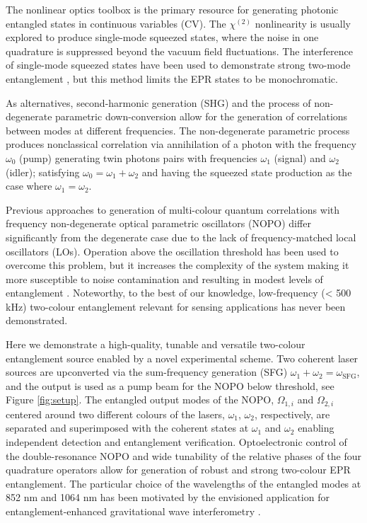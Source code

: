 \documentclass[final,twocolumn,english,prl,notitlepage,nofootinbib,floatfix,longbibliography,superscriptaddress
]{revtex4-2}
\begin{document}
The nonlinear optics toolbox is the primary resource for generating photonic entangled states in continuous variables (CV). The $\chi^{(2)}$ nonlinearity is usually explored to produce single-mode squeezed states, where the noise in one quadrature is suppressed beyond the vacuum field fluctuations. The interference of single-mode squeezed states have been used to demonstrate strong two-mode entanglement \cite{Eberle2013,Steinlechner2013}, but this method limits the EPR states to be monochromatic.\par
As alternatives, second-harmonic generation (SHG) \cite{Grosse2008} and the process of non-degenerate parametric down-conversion \cite{Ou1992,Schori2002} allow for the generation of correlations between modes at different frequencies. The non-degenerate parametric process produces nonclassical correlation via annihilation of a photon with the frequency $\omega_0$ (pump) generating twin photons pairs with frequencies $\omega_1$ (signal) and $\omega_2$ (idler); satisfying $\omega_0 = \omega_1 + \omega_2$ and having the squeezed state production as the case where $\omega_1=\omega_2$. \par
Previous approaches to generation of multi-colour quantum correlations with frequency non-degenerate optical parametric oscillators (NOPO) differ significantly from the degenerate case due to the lack of frequency-matched local oscillators (LOs).  Operation above the oscillation threshold has been used to overcome this problem, but it increases the complexity of the system making it more susceptible to noise contamination and resulting in modest levels of entanglement \cite{Villar2005,Guo2012,Wang2018a}. Noteworthy, to the best of our knowledge, low-frequency (< 500 kHz) two-colour entanglement relevant for sensing applications has never been demonstrated.\par
Here we demonstrate a high-quality, tunable and versatile two-colour  entanglement source enabled by a novel experimental scheme. Two coherent laser sources are upconverted via the sum-frequency generation (SFG) $\omega_1 + \omega_2 = \omega_{\text{SFG}}$, and the output is  used as a pump beam for the NOPO below threshold, see Figure \ref{fig:setup}. The entangled output modes of the NOPO, $\Omega_{1,i}$ and $\Omega_{2,i}$ centered around two different colours of the lasers, $\omega_1$, $\omega_2$, respectively, are separated and superimposed with the coherent states at $\omega_1$ and $\omega_2$ enabling independent detection and entanglement verification. Optoelectronic control of the double-resonance NOPO and wide tunability of the relative phases of the four quadrature operators allow for generation of robust and strong two-colour EPR entanglement. The particular choice of the wavelengths of the entangled modes at 852 nm and 1064 nm has been motivated by the envisioned application for entanglement-enhanced gravitational wave interferometry \cite{Khalili2018,Zeuthen2019}.\par
\end{document}
